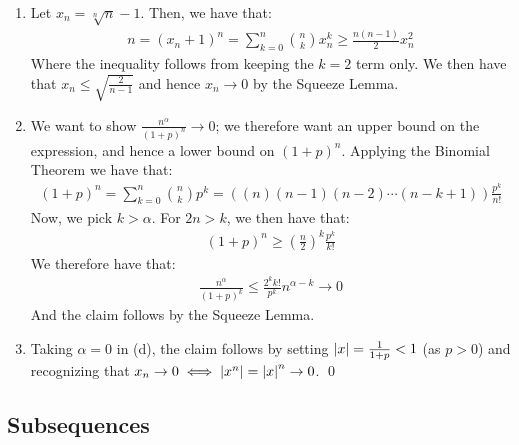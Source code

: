 \begin{nproof}
\begin{enumerate}
        \item Let $x_n = \sqrt[n]{n} - 1$. Then, we have that:
        \begin{align*}
            n = (x_n + 1)^n = \sum_{k=0}^n\binom{n}{k}x_n^k \geq \frac{n(n-1)}{2}x_n^2
        \end{align*}
        Where the inequality follows from keeping the $k = 2$ term only. We then have that $x_n \leq \sqrt{\frac{2}{n-1}}$ and hence $x_n \rightarrow 0$ by the Squeeze Lemma.
        \item We want to show $\frac{n^\alpha}{(1+p)^n} \rightarrow 0$; we therefore want an upper bound on the expression, and hence a lower bound on $(1+p)^n$. Applying the Binomial Theorem we have that:
        \begin{align*}
            (1+p)^n = \sum_{k=0}^n\binom{n}{k}p^k = \left((n)(n-1)(n-2)\cdots(n-k+1)\right)\frac{p^k}{n!}
        \end{align*}
        Now, we pick $k > \alpha$. For $2n > k$, we then have that:
        \begin{align*}
            (1+p)^n \geq \left(\frac{n}{2}\right)^k\frac{p^k}{k!}
        \end{align*}
        We therefore have that:
        \begin{align*}
            \frac{n^\alpha}{(1+p)^k} \leq \frac{2^kk!}{p^k}n^{\alpha - k} \rightarrow 0
        \end{align*}
        And the claim follows by the Squeeze Lemma.
        
        \item Taking $\alpha = 0$ in (d), the claim follows by setting $\abs{x} = \frac{1}{1+p} < 1$ (as $p > 0$) and recognizing that $x_n \rightarrow 0 \iff \abs{x^n} = \abs{x}^n \rightarrow 0$. \qed
    \end{enumerate}
\end{nproof}

\subsection{Subsequences}

